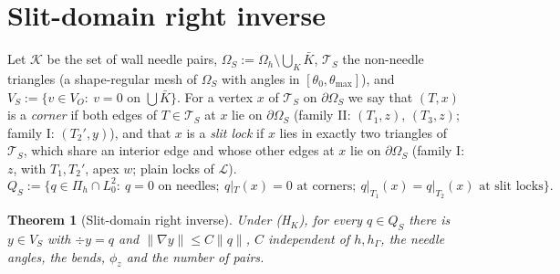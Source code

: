 \documentclass[11pt]{article}
\newtheorem{theorem}{Theorem}
\theoremstyle{remark}
\newcommand{\hG}{h_\Gamma}
\newcommand{\VO}{V_O}
\newcommand{\Pih}{\Pi_h}
\newcommand{\norm}[1]{\|#1\|}
\newcommand{\Lk}{\mathcal L}
\begin{document}
\section{Slit-domain right inverse}\label{sec:S}
Let $\mathcal K$ be the set of wall needle pairs, $\Omega_S:=\Omega_h\setminus\bigcup_{K}\bar K$, $\mathcal T_S$ the non-needle triangles
(a shape-regular mesh of $\Omega_S$ with angles in $[\theta_0,\theta_{\max}]$), and $V_S:=\{v\in\VO:\ v=0\text{ on }\bigcup\bar K\}$.
For a vertex $x$ of $\mathcal T_S$ on $\partial\Omega_S$ we say that $(T,x)$ is a \emph{corner} if both edges of $T\in\mathcal T_S$ at $x$ lie on $\partial\Omega_S$
(family II: $(T_1,z)$, $(T_3,z)$; family I: $(T_2',y)$), and that $x$ is a \emph{slit lock} if $x$ lies in exactly two triangles of $\mathcal T_S$,
which share an interior edge and whose other edges at $x$ lie on $\partial\Omega_S$ (family I: $z$, with $T_1,T_2'$, apex $w$; plain locks of $\Lk$).
\[
Q_S:=\{q\in\Pih\cap L^2_0:\ q=0\text{ on needles};\ q|_T(x)=0\text{ at corners};\ q|_{T_1}(x)=q|_{T_2}(x)\text{ at slit locks}\}.
\]
\begin{theorem}[Slit-domain right inverse]\label{thm:Sp}
Under (H$_K$), for every $q\in Q_S$ there is $y\in V_S$ with $\div y=q$ and $\norm{\nabla y}\le C\norm q$, $C$ independent of $h,\hG$, the needle angles,
the bends, $\phi_z$ and the number of pairs.
\end{theorem}
\end{document}
